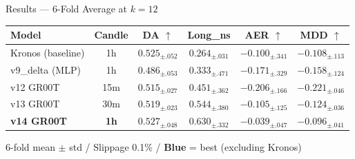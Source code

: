 \documentclass[aspectratio=169,11pt]{beamer}
\newcommand{\best}[1]{\textcolor{bestcol}{\textbf{#1}}}
\begin{document}
\begin{frame}{Results --- 6-Fold Average at $k=12$}
  \begin{table}
    \centering
    \renewcommand{\arraystretch}{1.4}
    \setlength{\tabcolsep}{5pt}
    \begin{tabular}{lc cccc}
      \toprule
      \textbf{Model} & \textbf{Candle} &
        \textbf{DA} $\uparrow$ & \textbf{Long\_ns} &
        \textbf{AER} $\uparrow$ & \textbf{MDD} $\uparrow$ \\
      \midrule
      \rowcolor{rowgray}
      Kronos (baseline) & 1h &
        $0.525_{\pm.052}$ & $0.264_{\pm.031}$ &
        $-0.100_{\pm.341}$ & $-0.108_{\pm.113}$ \\
      v9\_delta (MLP) & 1h &
        $0.486_{\pm.053}$ & $0.333_{\pm.471}$ &
        $-0.171_{\pm.329}$ & $-0.158_{\pm.124}$ \\
      \rowcolor{rowgray}
      v12 GR00T & 15m &
        $0.515_{\pm.027}$ & $0.451_{\pm.362}$ &
        $-0.206_{\pm.166}$ & $-0.221_{\pm.046}$ \\
      v13 GR00T & 30m &
        $0.519_{\pm.023}$ & $0.544_{\pm.380}$ &
        $-0.105_{\pm.125}$ & $-0.124_{\pm.036}$ \\
      \rowcolor{rowgray}
      \textbf{v14 GR00T} & \textbf{1h} &
        \best{$0.527_{\pm.048}$} & $0.630_{\pm.332}$ &
        \best{$-0.039_{\pm.047}$} & \best{$-0.096_{\pm.041}$} \\
      \bottomrule
    \end{tabular}
    \par\vspace{0.3em}\centering\footnotesize 6-fold mean $\pm$ std / Slippage 0.1\% / \textcolor{bestcol}{\textbf{Blue}} = best (excluding Kronos)
  \end{table}
\end{frame}
\end{document}
